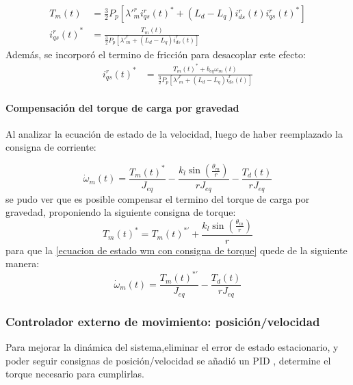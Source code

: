 \documentclass[a4paper, 10pt, onecolumn,journal]{ieeeconf}
\begin{document}
\begin{align}
	T_m(t) &= \frac{3}{2} P_p [\lambda'^r_{m} {i^r_{qs}(t)}^* + (L_d - L_q) i^r_{ds}(t) {i^r_{qs}(t)}^*] \label{torque electromagnetico 2}\\
	{i^r_{qs}(t)}^* &= \frac{T_m(t)}{\frac{3}{2} P_p [\lambda'^r_{m} + (L_d - L_q) i^r_{ds}(t)]}
\end{align}
 Además, se incorporó el termino de fricción para desacoplar este efecto:
 \begin{align}
 	{i^r_{qs}(t)}^* &= \frac{{T_m(t)}^* + b_{eq} \omega_m(t) }{\frac{3}{2} P_p [\lambda'^r_{m} + (L_d - L_q) i^r_{ds}(t)]}
 \end{align}
	
\paragraph{\textbf{Compensación del torque de carga por gravedad}}
Al analizar la ecuación de estado de la velocidad, luego de haber reemplazado la consigna de corriente:

\begin{equation}
	\dot{\omega}_m(t) = \frac{{T_m(t)}^*}{ J_{eq}} - \frac{k_l \sin \left( \frac{\theta_m}{r}\right) }{r J_{eq}} - \frac{T_d(t)}{r J_{eq}}
	\label{ecuacion de estado wm con consigna de torque}
\end{equation}
se pudo ver que es posible compensar el termino del torque de carga por gravedad, proponiendo la siguiente consigna de torque:
\begin{equation}
	{T_m(t)}^* = {T_m(t)}^{*'} + \frac{k_l \sin \left( \frac{\theta_m}{r}\right) }{r}
	\label{consigna de torque para desacoplar carga por gravedad}
\end{equation}
para que la \cref{ecuacion de estado wm con consigna de torque} quede de la siguiente manera:
\begin{equation}
	\dot{\omega}_m(t) = \frac{{T_m(t)}^{*'}}{ J_{eq}}- \frac{T_d(t)}{r J_{eq}}
	\label{ecuacion de estado wm sin gravedad}
\end{equation}

\subsubsection{\textbf{Controlador externo de movimiento: posición/velocidad}}
Para mejorar la dinámica del sistema,eliminar el error de estado estacionario, y poder seguir consignas de posición/velocidad se añadió un PID , determine el torque necesario para cumplirlas.
\end{document}
